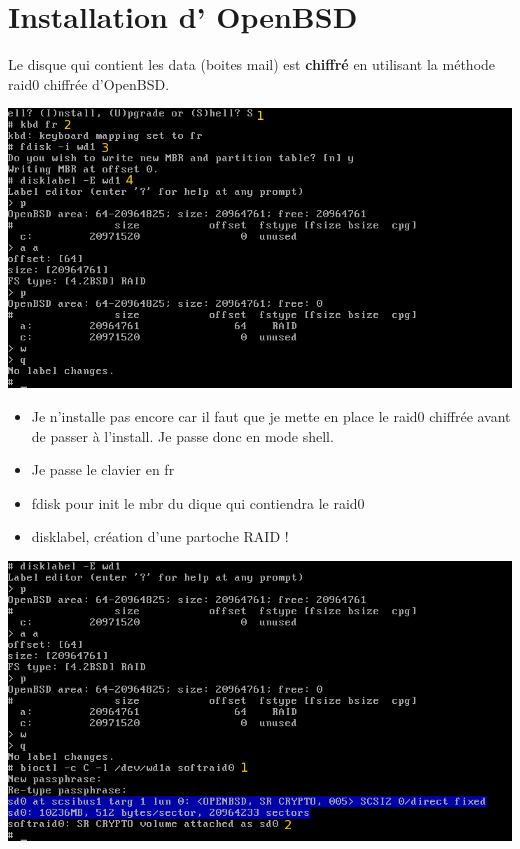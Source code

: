 \documentclass[a4paper,11pt]{article}
\begin{document}
\vspace{5mm}
\section*{Installation d' OpenBSD}

Le disque qui contient les data (boites mail) est {\bf chiffré} en utilisant la
méthode raid0 chiffrée d'OpenBSD. 

\vspace{5mm}
\includegraphics[scale=0.70]{medias/prepadisk.png}
\vspace{5mm}

\begin{itemize}
	\item Je n'installe pas encore car il faut que je mette en place le raid0 chiffrée
 avant de passer à l'install. Je passe donc en mode shell. 
	\item Je passe le clavier en fr
	\item fdisk pour init le mbr du dique qui contiendra le raid0
	\item disklabel, création d'une partoche RAID !
\end{itemize}

\vspace{5mm}
\includegraphics[scale=0.70]{medias/bioctl.png}
\vspace{5mm}
\end{document}
